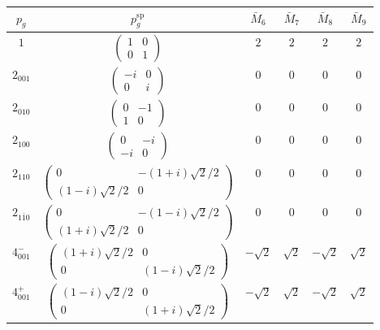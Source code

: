 \documentclass[3p,preprint]{elsarticle}
\begin{document}
\begin{table}[H]
	\begin{tabular}{|c|c||c|c|c|c|}\hline
		$p_g$ & $p_g^{\text{sp}}$ & $\bar{M}_6$ & $\bar{M}_7$ & $\bar{M}_8$ & $\bar{M}_9$   \\ \hline \hline
		$1$ & 				$\left(\begin{array}{cc} 1&0 \\ 0&1 \end{array}\right)$	& $2$ &  $2$ &  $2$ &  $2$ \\ \hline
		$2_{001}$ &		$\left(\begin{array}{cc} -i&0 \\ 0&i \end{array}\right)$	& $0$ & $0$ & $0$ & $0$  \\ \hline
		$2_{010}$ &		$\left(\begin{array}{cc} 0&-1 \\ 1&0 \end{array}\right)$	& $0$ & $0$ & $0$ & $0$  \\ \hline
		$2_{100}$ &		$\left(\begin{array}{cc} 0&-i \\ -i&0 \end{array}\right)$	& $0$ & $0$ & $0$ & $0$  \\ \hline
		$2_{110}$ &		$\left(\begin{array}{cc} 0&-(1+i)\sqrt{2}/2 \\ (1-i)\sqrt{2}/2&0 \end{array}\right)$	&$0$ & $0$ & $0$ & $0$  \\ \hline
		$2_{1\bar{1}0}$ &		$\left(\begin{array}{cc} 0&-(1-i)\sqrt{2}/2 \\ (1+i)\sqrt{2}/2&0 \end{array}\right)$	&$0$ & $0$ & $0$ & $0$  \\ \hline
		$4^{-}_{001}$ &		$\left(\begin{array}{cc} (1+i)\sqrt{2}/2&0 \\ 0&(1-i)\sqrt{2}/2 \end{array}\right)$	&$-\sqrt{2}$ & $\sqrt{2}$ & $-\sqrt{2}$ & $\sqrt{2}$  \\ \hline
		$4^{+}_{001}$ &		$\left(\begin{array}{cc} (1-i)\sqrt{2}/2&0 \\ 0&(1+i)\sqrt{2}/2 \end{array}\right)$	&$-\sqrt{2}$ & $\sqrt{2}$ & $-\sqrt{2}$ & $\sqrt{2}$  \\ \hline
		

\end{tabular}
\end{table}
\end{document}
